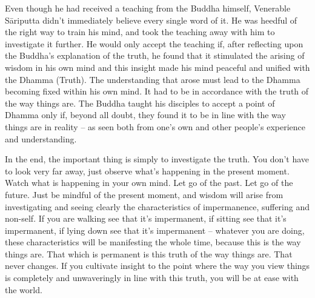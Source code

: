 Even though he had received a teaching from the Buddha himself, Venerable S\=ariputta didn't immediately believe every single word of it. He was heedful of the right way to train his mind, and took the teaching away with him to investigate it further. He would only accept the teaching if, after reflecting upon the Buddha's explanation of the truth, he found that it stimulated the arising of wisdom in his own mind and this insight made his mind peaceful and unified with the Dhamma (Truth). The understanding that arose must lead to the Dhamma becoming fixed within his own mind. It had to be in accordance with the truth of the way things are. The Buddha taught his disciples to accept a point of Dhamma only if, beyond all doubt, they found it to be in line with the way things are in reality -- as seen both from one's own and other people's experience and understanding.

In the end, the important thing is simply to investigate the truth. You don't have to look very far away, just observe what's happening in the present moment. Watch what is happening in your own mind. Let go of the past. Let go of the future. Just be mindful of the present moment, and wisdom will arise from investigating and seeing clearly the characteristics of impermanence, suffering and non-self. If you are walking see that it's impermanent, if sitting see that it's impermanent, if lying down see that it's impermanent -- whatever you are doing, these characteristics will be manifesting the whole time, because this is the way things are. That which is permanent is this truth of the way things are. That never changes. If you cultivate insight to the point where the way you view things is completely and unwaveringly in line with this truth, you will be at ease with the world.

